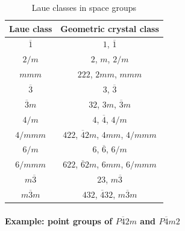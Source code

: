 \begin{table}[htb]
  \centering
  \caption{Laue classes in space groups}
  \label{tab:laue_class}
  \begin{tabular}[h]{cc}
    \hline\hline
    Laue class       & Geometric crystal class \\ \hline
    $\overline{1}$   & $1$, $\overline{1}$ \\
    $2/m$            & $2$, $m$, $2/m$ \\
    $mmm$            & $222$, $2mm$, $mmm$ \\
    $\overline{3}$   & $3$, $\overline{3}$ \\
    $\overline{3}m$  & $32$, $3m$, $\overline{3}m$ \\
    $4/m$            & $4$, $\overline{4}$, $4/m$ \\
    $4/mmm$          & $422$, $\overline{4}2m$, $4mm$, $4/mmm$ \\
    $6/m$            & $6$, $\overline{6}$, $6/m$ \\
    $6/mmm$          & $622$, $\overline{6}2m$, $6mm$, $6/mmm$ \\
    $m\overline{3}$  & $23$, $m\overline{3}$ \\
    $m\overline{3}m$ & $432$, $\overline{4}32$, $m\overline{3}m$ \\
    \hline\hline
  \end{tabular}
\end{table}

\paragraph{Example: point groups of $P\overline{4}2m$ and $P\overline{4}m2$}

